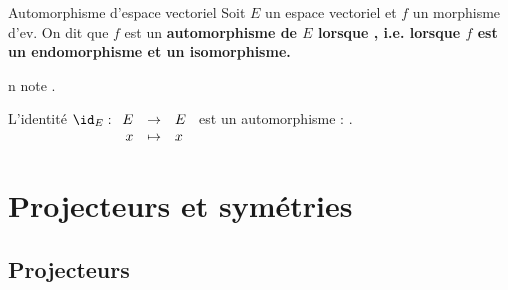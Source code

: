 \documentclass[a4paper,french,bookmarks]{article}
\begin{document}
\begin{definition}{Automorphisme d'espace vectoriel}{}
    Soit $E$ un espace vectoriel et $f$ un morphisme d'ev. On dit que $f$ est un \bf{automorphisme de $E$} lorsque , i.e. lorsque $f$ est un endomorphisme et un isomorphisme.
    
    n note .
\end{definition}

\begin{example}{}{}
    \begin{enumerate}
        \ithand L'identité $\id_E : \begin{array}[t]{rcl}
            E &\to& E  \\
            x &\mapsto& x 
        \end{array}$ est un automorphisme : .
    \end{enumerate}
\end{example}

\section{Projecteurs et symétries}

\subsection{Projecteurs}
\end{document}
